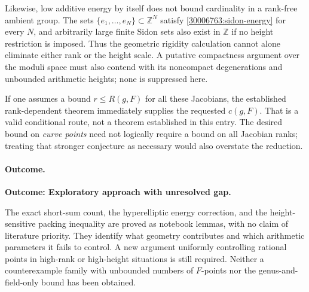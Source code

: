 \documentclass[11pt,a4paper]{article}
\newcommand{\Z}{\mathbb{Z}}
\numberwithin{equation}{section}
\begin{document}
Likewise, low additive energy by itself does not bound cardinality in a
rank-free ambient group. The sets $\{e_1,\ldots,e_N\}\subset\Z^N$ satisfy
\eqref{30006763:sidon-energy} for every $N$, and arbitrarily large finite
Sidon sets also exist in $\Z$ if no height restriction is imposed. Thus
the geometric rigidity calculation cannot alone eliminate either rank
or the height scale. A putative compactness argument over the moduli
space must also contend with its noncompact degenerations and unbounded
arithmetic heights; none is suppressed here.

If one assumes a bound $r\le R(g,F)$ for all these Jacobians, the
established rank-dependent theorem immediately supplies the requested
$c(g,F)$. That is a valid conditional route, not a theorem established
in this entry. The desired bound on \emph{curve points} need not logically
require a bound on all Jacobian ranks; treating that stronger conjecture
as necessary would also overstate the reduction.

\paragraph{Outcome.}
\textbf{Outcome: Exploratory approach with unresolved gap.}

The exact short-sum count, the hyperelliptic energy correction, and the
height-sensitive packing inequality are proved as notebook lemmas, with
no claim of literature priority. They identify what geometry contributes
and which arithmetic parameters it fails to control. A new argument
uniformly controlling rational points in high-rank or high-height
situations is still required. Neither a counterexample family with
unbounded numbers of $F$-points nor the genus-and-field-only bound has
been obtained.

\end{document}
